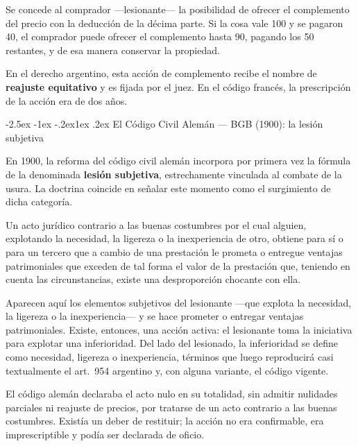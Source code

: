 \documentclass[12pt,oneside]{book}
\makeatletter
\renewcommand\subsection{\@startsection{subsection}{2}{\z@}%
  {-2.5ex \@plus -1ex \@minus -.2ex}{1ex \@plus .2ex}%
  {\normalfont\normalsize\bfseries}}
\makeatother
\begin{document}
\begin{ejemplo}
Se concede al comprador ---lesionante--- la posibilidad de ofrecer el complemento del precio con la deducción de la décima parte. Si la cosa vale 100 y se pagaron 40, el comprador puede ofrecer el complemento hasta 90, pagando los 50 restantes, y de esa manera conservar la propiedad.
\end{ejemplo}

En el derecho argentino, esta acción de complemento recibe el nombre de \textbf{reajuste equitativo} y es fijada por el juez. En el código francés, la prescripción de la acción era de dos años.

\subsection{El Código Civil Alemán --- BGB (1900): la lesión subjetiva}

En 1900, la reforma del código civil alemán incorpora por primera vez la fórmula de la denominada \textbf{lesión subjetiva}, estrechamente vinculada al combate de la usura. La doctrina coincide en señalar este momento como el surgimiento de dicha categoría.

\begin{regla}
Un acto jurídico contrario a las buenas costumbres por el cual alguien, explotando la necesidad, la ligereza o la inexperiencia de otro, obtiene para sí o para un tercero que a cambio de una prestación le prometa o entregue ventajas patrimoniales que exceden de tal forma el valor de la prestación que, teniendo en cuenta las circunstancias, existe una desproporción chocante con ella.
\end{regla}

Aparecen aquí los elementos subjetivos del lesionante ---que explota la necesidad, la ligereza o la inexperiencia--- y se hace prometer o entregar ventajas patrimoniales. Existe, entonces, una acción activa: el lesionante toma la iniciativa para explotar una inferioridad. Del lado del lesionado, la inferioridad se define como necesidad, ligereza o inexperiencia, términos que luego reproducirá casi textualmente el art.\ 954 argentino y, con alguna variante, el código vigente.

\begin{importante}
El código alemán declaraba el acto nulo en su totalidad, sin admitir nulidades parciales ni reajuste de precios, por tratarse de un acto contrario a las buenas costumbres. Existía un deber de restituir; la acción no era confirmable, era imprescriptible y podía ser declarada de oficio.
\end{importante}
\end{document}
